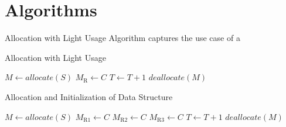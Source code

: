 \documentclass[letterpaper, 10 pt, conference]{ieeeconf}  %
\begin{document}


\section{Algorithms}

Allocation with Light Usage Algorithm captures the use case of a 


\begin{algorithm}[h]
\caption{Allocation with Light Usage}
\begin{algorithmic}
  \STATE $M \leftarrow allocate(S)$
  \STATE $M_\text{R} \leftarrow C$
  \STATE $T \leftarrow T + 1$
  \STATE $deallocate(M)$
\ENDWHILE
\end{algorithmic}
\label{light_usage_algorithm}
\end{algorithm}

\begin{algorithm}[h]
  \caption{Allocation and Initialization of Data Structure}
  \begin{algorithmic}
      \STATE $M \leftarrow allocate(S)$
      \STATE $M_\text{R1} \leftarrow C$
      \STATE $M_\text{R2} \leftarrow C$
      \STATE $M_\text{R3} \leftarrow C$
      \STATE $T \leftarrow T + 1$
      \STATE $deallocate(M)$
    \ENDWHILE
  \end{algorithmic}
  \label{struct_usage_algorithm}
\end{algorithm}
\end{document}
